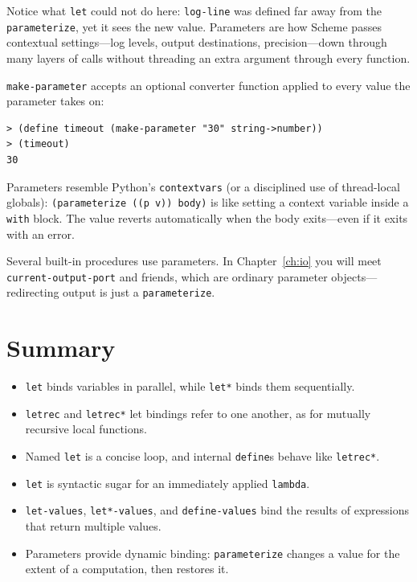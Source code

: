 Notice what \texttt{let} could not do here: \texttt{log-line} was defined far away from the \texttt{parameterize}, yet it sees the new value. Parameters are how Scheme passes contextual settings---log levels, output destinations, precision---down through many layers of calls without threading an extra argument through every function.

\texttt{make-parameter} accepts an optional converter function applied to every value the parameter takes on:

\begin{lstlisting}[style=repl]
> (define timeout (make-parameter "30" string->number))
> (timeout)
30
\end{lstlisting}

\begin{note}
Parameters resemble Python's \texttt{contextvars} (or a disciplined use of thread-local globals): \texttt{(parameterize ((p v)) body)} is like setting a context variable inside a \texttt{with} block. The value reverts automatically when the body exits---even if it exits with an error.
\end{note}

Several built-in procedures use parameters. In Chapter~\ref{ch:io} you will meet \texttt{current-output-port} and friends, which are ordinary parameter objects---redirecting output is just a \texttt{parameterize}.

\section*{Summary}

\begin{itemize}
    \item \texttt{let} binds variables in parallel, while \texttt{let*} binds them sequentially.
    \item \texttt{letrec} and \texttt{letrec*} let bindings refer to one another, as for mutually recursive local functions.
    \item Named \texttt{let} is a concise loop, and internal \texttt{define}s behave like \texttt{letrec*}.
    \item \texttt{let} is syntactic sugar for an immediately applied \texttt{lambda}.
    \item \texttt{let-values}, \texttt{let*-values}, and \texttt{define-values} bind the results of expressions that return multiple values.
    \item Parameters provide dynamic binding: \texttt{parameterize} changes a value for the extent of a computation, then restores it.
\end{itemize}

